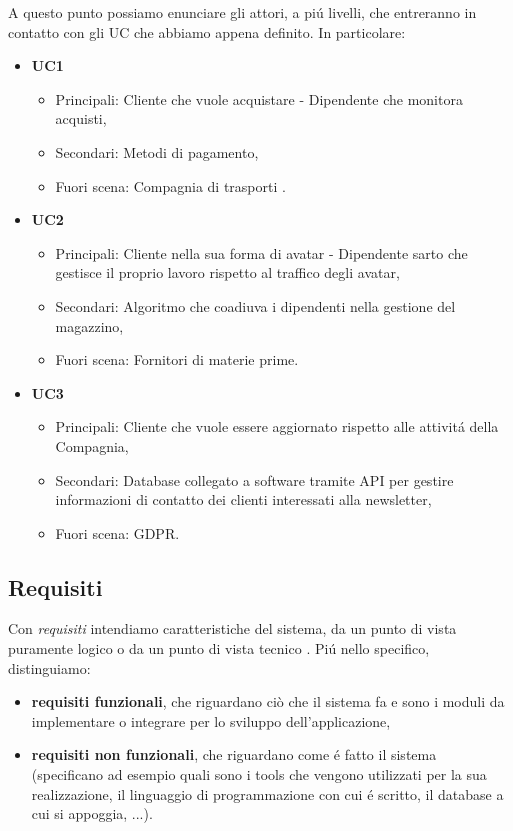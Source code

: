 \documentclass[12pt]{article}
\begin{document}
A questo punto possiamo enunciare gli attori, a pi\'u livelli, che entreranno in contatto con gli UC che abbiamo appena definito. In particolare:
\begin{itemize}
    \item \textbf{UC1}
        \begin{itemize}
        \item Principali: Cliente che vuole acquistare - Dipendente che monitora acquisti,
        \item Secondari: Metodi di pagamento,
        \item Fuori scena: Compagnia di trasporti .
        \end{itemize}
    \item \textbf{UC2}
        \begin{itemize}
        \item Principali: Cliente nella sua forma di avatar - Dipendente sarto che gestisce il proprio lavoro rispetto al traffico degli avatar,
        \item Secondari: Algoritmo che coadiuva i dipendenti nella gestione del magazzino,
        \item Fuori scena: Fornitori di materie prime.
        \end{itemize}
    \item \textbf{UC3}
        \begin{itemize}
        \item Principali: Cliente che vuole essere aggiornato rispetto alle attivit\'a della Compagnia, 
        \item Secondari: Database collegato a software tramite API per gestire informazioni di contatto dei clienti interessati alla newsletter,
        \item Fuori scena: GDPR.
        \end{itemize}
\end{itemize}

\subsection{Requisiti}

Con \textit{requisiti} intendiamo caratteristiche del sistema, da un punto di vista puramente logico o da un punto di vista tecnico \cite{elicitation_tools}. Pi\'u nello specifico, distinguiamo: 
\begin{itemize}
    \item \textbf{requisiti funzionali}, che riguardano ciò che il sistema fa e sono i moduli da implementare o integrare per lo sviluppo dell’applicazione,
    \item \textbf{requisiti non funzionali}, che riguardano come \'e fatto il sistema (specificano ad esempio quali sono i tools che vengono utilizzati per la sua realizzazione, il linguaggio di programmazione con cui \'e scritto, il database a cui si appoggia, ...).
\end{itemize}
\end{document}
